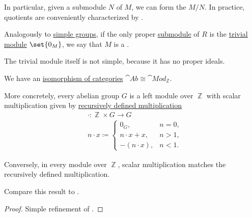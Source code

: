 \begin{definition}
\begin{thmenum}
    In particular, given a submodule \( N \) of \( M \), we can form the  \( M / N \). In practice, quotients are conveniently characterized by .

     Analogously to \hyperref[def:group/simple]{simple groups}, if the only proper \hyperref[def:module/submodel]{submodule} of \( R \) is the \hyperref[def:module/trivial]{trivial module} \( \set{ 0_M } \), we say that \( M \) is a .

    The trivial module itself is not simple, because it has no proper ideals.
  \end{thmenum}
\end{definition}

\begin{proposition}\label{thm:abelian_group_is_module}
  We have an \hyperref[rem:category_similarity/isomorphism]{isomorphism of categories} \( \hyperref[def:abelian_group]{\cat{Ab}} \cong \hyperref[def:module]{\cat{Mod}_\BbbZ} \).

  More concretely, every abelian group \( G \) is a left module over \( \BbbZ \) with scalar multiplication given by \hyperref[rem:additive_magma/multiplication]{recursively defined multiplication}
  \begin{equation}\label{eq:thm:abelian_group_is_module/operation}
    \begin{aligned}
      &\cdot: \BbbZ \times G \to G \\
      &n \cdot x \coloneqq \begin{cases}
        0_G,           &n = 0, \\
        n \cdot x + x, &n > 1, \\
        -(n \cdot x),  &n < 1.
      \end{cases}
    \end{aligned}
  \end{equation}

  Conversely, in every module over \( \BbbZ \), scalar multiplication matches the recursively defined multiplication.

  Compare this result to .
\end{proposition}
\begin{proof}
  Simple refinement of .
\end{proof}

